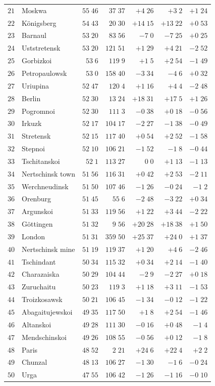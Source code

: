 \begin{center}
\begin{tabular}{rl|r|r||r|r|r}
$21$&Moskwa&$55\;46$&$37\;37$&$+4\;26$&$+3\;2$&$+1\;24$\\
$22$&Königsberg&$54\;43$&$20\;30$&$+14\;15$&$+13\;22$&$+0\;53$\\
$23$&Barnaul&$53\;20$&$83\;56$&$-7\;0$&$-7\;25$&$+0\;25$\\
$24$&Uststretensk&$53\;20$&$121\;51$&$+1\;29$&$+4\;21$&$-2\;52$\\
$25$&Gorbizkoi&$53\;6$&$119\;9$&$+1\;5$&$+2\;54$&$-1\;49$\\
$26$&Petropaulowsk&$53\;0$&$158\;40$&$-3\;34$&$-4\;6$&$+0\;32$\\
$27$&Uriupina&$52\;47$&$120\;4$&$+1\;16$&$+4\;4$&$-2\;48$\\
$28$&Berlin&$52\;30$&$13\;24$&$+18\;31$&$+17\;5$&$+1\;26$\\
$29$&Pogromnoi&$52\;30$&$111\;3$&$-0\;38$&$+0\;18$&$-0\;56$\\
$30$&Irkuzk&$52\;17$&$104\;17$&$-2\;27$&$-1\;38$&$-0\;49$\\[2pt]
$31$&Stretensk&$52\;15$&$117\;40$&$+0\;54$&$+2\;52$&$-1\;58$\\
$32$&Stepnoi&$52\;10$&$106\;21$&$-1\;52$&$-1\;8$&$-0\;44$\\
$33$&Tschitanskoi&$52\;1$&$113\;27$&$0\;0$&$+1\;13$&$-1\;13$\\
$34$&Nertschinsk town&$51\;56$&$116\;31$&$+0\;42$&$+2\;53$&$-2\;11$\\
$35$&Werchneudinsk&$51\;50$&$107\;46$&$-1\;26$&$-0\;24$&$-1\;2$\\
$36$&Orenburg&$51\;45$&$55\;6$&$-2\;48$&$-3\;22$&$+0\;34$\\
$37$&Argunskoi&$51\;33$&$119\;56$&$+1\;22$&$+3\;44$&$-2\;22$\\
$38$&Göttingen&$51\;32$&$9\;56$&$+20\;28$&$+18\;38$&$+1\;50$\\
$39$&London&$51\;31$&$359\;50$&$+25\;37$&$+24\;0$&$+1\;37$\\
$40$&Nertschinsk mine&$51\;19$&$119\;37$&$+1\;20$&$+4\;6$&$-2\;46$\\[2pt]
$41$&Tschindant&$50\;34$&$115\;32$&$+0\;34$&$+2\;14$&$-1\;40$\\
$42$&Charazaiska&$50\;29$&$104\;44$&$-2\;9$&$-2\;27$&$+0\;18$\\
$43$&Zuruchaitu&$50\;23$&$119\;3$&$+1\;18$&$+3\;11$&$-1\;53$\\
$44$&Troizkosawsk&$50\;21$&$106\;45$&$-1\;34$&$-0\;12$&$-1\;22$\\
$45$&Abagaitujewskoi&$49\;35$&$117\;50$&$+1\;8$&$+2\;54$&$-1\;46$\\
$46$&Altanskoi&$49\;28$&$111\;30$&$-0\;16$&$+0\;48$&$-1\;4$\\
$47$&Mendschinskoi&$49\;26$&$108\;55$&$-0\;56$&$+0\;12$&$-1\;8$\\
$48$&Paris&$48\;52$&$2\;21$&$+24\;6$&$+22\;4$&$+2\;2$\\
$49$&Chunzal&$48\;13$&$106\;27$&$-1\;30$&$-1\;6$&$-0\;24$\\
$50$&Urga&$47\;55$&$106\;42$&$-1\;26$&$-1\;16$&$-0\;10$\\
\hline
\end{tabular}
\end{center}
\endgroup

